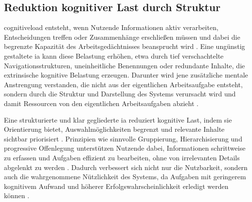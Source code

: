 \subsection{Reduktion kognitiver Last durch Struktur}
\label{subsec:02-03-02_cognitive-load}

\Gls{cognitiveload} entsteht, wenn Nutzende Informationen aktiv verarbeiten, Entscheidungen treffen oder Zusammenhänge erschließen müssen und dabei die begrenzte Kapazität des Arbeitsgedächtnisses beansprucht wird \cite{105:Sweller1988,414:Johnson2021}. Eine ungünstig gestaltete \Gls{ia} kann diese Belastung erhöhen, etwa durch tief verschachtelte Navigationsstrukturen, uneinheitliche Benennungen oder redundante Inhalte, die extrinsische kognitive Belastung erzeugen. Darunter wird jene zusätzliche mentale Anstrengung verstanden, die nicht aus der eigentlichen Arbeitsaufgabe entsteht, sondern durch die Struktur und Darstellung des Systems verursacht wird und damit Ressourcen von den eigentlichen Arbeitsaufgaben abzieht \cite{105:Sweller1988,414:Johnson2021}.

Eine strukturierte und klar gegliederte \Gls{ia} reduziert kognitive Last, indem sie Orientierung bietet, Auswahlmöglichkeiten begrenzt und relevante Inhalte sichtbar priorisiert \cite{414:Johnson2021,415:Krug2014}. Prinzipien wie sinnvolle Gruppierung, Hierarchisierung und progressive Offenlegung unterstützen Nutzende dabei, Informationen schrittweise zu erfassen und Aufgaben effizient zu bearbeiten, ohne von irrelevanten Details abgelenkt zu werden \cite{415:Krug2014}. Dadurch verbessert sich nicht nur die Nutzbarkeit, sondern auch die wahrgenommene Nützlichkeit des Systems, da Aufgaben mit geringerem kognitivem Aufwand und höherer Erfolgswahrscheinlichkeit erledigt werden können \cite{102:Davis1989,300:FraunhoferIESE2018}.

